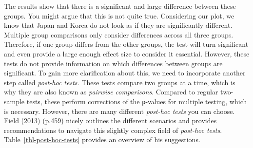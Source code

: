 \documentclass[
  letterpaper,
  DIV=11,
  numbers=noendperiod]{scrreprt}
\begin{document}
The results show that there is a significant and large difference
between these groups. You might argue that this is not quite true.
Considering our plot, we know that Japan and Korea do not look as if
they are significantly different. Multiple group comparisons only
consider differences across all three groups. Therefore, if one group
differs from the other groups, the test will turn significant and even
provide a large enough effect size to consider it essential. However,
these tests do not provide information on which differences between
groups are significant. To gain more clarification about this, we need
to incorporate another step called \emph{post-hoc tests.} These tests
compare two groups at a time, which is why they are also known as
\emph{pairwise comparisons}. Compared to regular two-sample tests, these
perform corrections of the \texttt{p}-values for multiple testing, which
is necessary. However, there are many different \emph{post-hoc tests}
you can choose. Field (2013) (p.459) nicely outlines the different
scenarios and provides recommendations to navigate this slightly complex
field of \emph{post-hoc tests}. Table~\ref{tbl-post-hoc-tests} provides
an overview of his suggestions.
\end{document}
